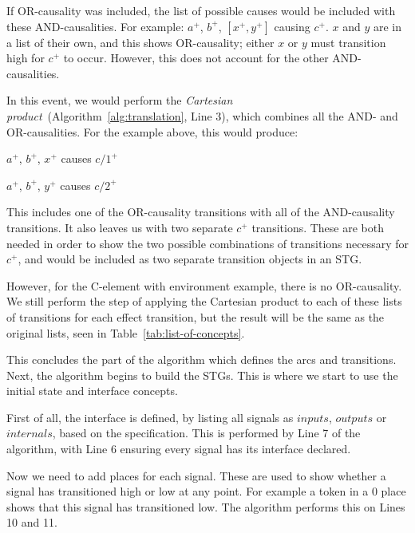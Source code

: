 \documentclass[british,conference,compsoc]{IEEEtran}
\begin{document}
If OR-causality was included, the list of possible causes would be included with these
AND-causalities. For example:  $a^{+}$, $b^{+}$, $[x^{+}, y^{+}]$ causing
$c^{+}$. $x$ and $y$ are in a list of their own, and this shows OR-causality;
either $x$ or $y$ must transition high for $c^{+}$ to occur. However, this does
not account for the other AND-causalities. 

In this event, we would perform the \emph{Cartesian product}~(Algorithm~\ref{alg:translation}, Line 3), which combines
all the AND- and OR-causalities. For the example above, this would produce:

\vspace{-2mm}

\begin{center}

$a^{+}$, $b^{+}$, $x^{+}$ causes $c/1^{+}$

$a^{+}$, $b^{+}$, $y^{+}$ causes $c/2^{+}$

\end{center}

\vspace{-2mm}

\noindent This includes one of the OR-causality transitions with all of the 
AND-causality transitions. It also leaves us with two separate $c^{+}$ 
transitions. These are both needed in order to show the two possible 
combinations of transitions necessary for $c^{+}$, and would be included as two
separate transition objects in an STG. 

However, for the C-element with environment example, there is no OR-causality. 
We still perform the step of applying the Cartesian product to each of these 
lists of transitions for each effect transition, but the result will be the 
same as the original lists, seen in Table~\ref{tab:list-of-concepts}.

This concludes the part of the algorithm which defines the arcs
and transitions. Next, the algorithm begins to build the STGs. This is where
we start to use the initial state and interface concepts. 

First of all, the interface is defined, by listing all signals as 
$inputs$, $outputs$ or $internals$, based on the specification. This
is performed by Line 7 of the algorithm, with Line 6 ensuring every
signal has its interface declared. 

Now we need to add places for each signal. These are used to
show whether a signal has transitioned high or low at any point. 
For example a token in a $0$ place shows that this signal has 
transitioned low. The algorithm performs this on Lines 10 and 11.  
\end{document}
